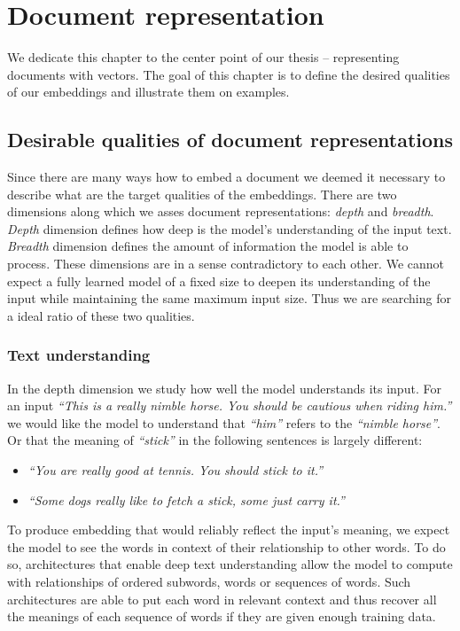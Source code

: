 \chapter{Document representation}\label{chapter:document_representation}

We dedicate this chapter to the center point of our thesis --
representing documents with vectors. The goal of this chapter is to define the
desired qualities of our embeddings and illustrate them on examples.

\section{Desirable qualities of document representations}

Since there are many ways how to embed a document we deemed it necessary to
describe what are the target qualities of the embeddings. There are two
dimensions along which we asses document representations: \emph{depth} and
\emph{breadth}. \emph{Depth} dimension defines how deep is the model's
understanding of the input text. \emph{Breadth} dimension defines the amount of
information the model is able to process. These dimensions are in a sense
contradictory to each other. We cannot expect a fully learned model of a fixed
size to deepen its understanding of the input while maintaining the same
maximum input size. Thus we are searching for a ideal ratio of these two
qualities.

\subsection{Text understanding}

In the depth dimension we study how well the model understands its input. For
an input \emph{``This is a really nimble horse. You should be cautious when
riding him.''} we would like the model to understand that \emph{``him''} refers to
the \emph{``nimble horse''}. Or that the meaning of \emph{``stick''} in the
following sentences is largely different:

\begin{itemize}
  \item \emph{``You are really good at tennis. You should stick to it.''}
  \item \emph{``Some dogs really like to fetch a stick, some just carry it.''}
\end{itemize}

To produce embedding that would reliably reflect the input's meaning, we expect
the model to see the words in context of their relationship to other words. To
do so, architectures that enable deep text understanding allow the model to
compute with relationships of ordered subwords, words or sequences of words.
Such architectures are able to put each word in relevant context and thus
recover all the meanings of each sequence of words if they are given enough
training data.

